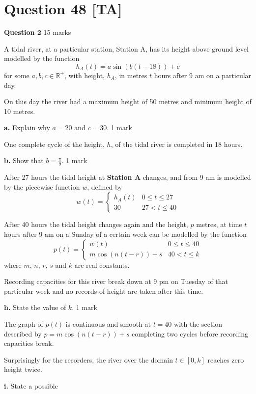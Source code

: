 \documentclass[10pt,a4paper]{article}
\begin{document}
\section*{Question 48 [TA]}

\textbf{Question 2} \hfill 15 marks

A tidal river, at a particular station, Station A, has its height above ground level modelled by the function
\[
h_A(t) = a\sin(b(t-18)) + c
\]
for some $a, b, c \in \mathbb{R}^+$, with height, $h_A$, in metres $t$ hours after 9 am on a particular day.

On this day the river had a maximum height of 50 metres and minimum height of 10 metres.

\textbf{a.} Explain why $a = 20$ and $c = 30$. \hfill 1 mark

\vspace{9\baselineskip}

One complete cycle of the height, $h$, of the tidal river is completed in 18 hours.

\textbf{b.} Show that $b = \frac{\pi}{9}$. \hfill 1 mark

\vspace{9\baselineskip}

After 27 hours the tidal height at \textbf{Station A} changes, and from 9 am is modelled by the piecewise function $w$, defined by
\[
w(t) = \begin{cases}
h_A(t) & 0 \leq t \leq 27 \\
30 & 27 < t \leq 40
\end{cases}
\]

After 40 hours the tidal height changes again and the height, $p$ metres, at time $t$ hours after 9 am on a Sunday of a certain week can be modelled by the function
\[
p(t) = \begin{cases}
w(t) & 0 \leq t \leq 40 \\
m\cos(n(t-r)) + s & 40 < t \leq k
\end{cases}
\]
where $m$, $n$, $r$, $s$ and $k$ are real constants.

Recording capacities for this river break down at 9 pm on Tuesday of that particular week and no records of height are taken after this time.

\textbf{h.} State the value of $k$. \hfill 1 mark

\vspace{9\baselineskip}

The graph of $p(t)$ is continuous and smooth at $t = 40$ with the section described by $p = m\cos(n(t-r)) + s$ completing two cycles before recording capacities break.

Surprisingly for the recorders, the river over the domain $t \in [0,k]$ reaches zero height twice.

\textbf{i.} State a possible
\end{document}
